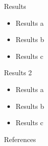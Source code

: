 \documentclass[final,hyperref={pdfpagelabels=false},xcolor=table]{beamer}
\begin{document}
\begin{frame}[t]
\begin{columns}[t]
\begin{column}{.3\textwidth}
    \begin{block}{Results}
     \begin{itemize}
          \item Results a
          \item Results b
          \item Results c
     \end{itemize}

    \end{block}

    \begin{block}{Results 2}
     \begin{itemize}
          \item Results a
          \item Results b
          \item Results c
     \end{itemize}

    \end{block}


    \begin{block}{References}
      \linespread{0.928}\selectfont
      \footnotesize{
      }
    \end{block}

  \end{column} %

  \begin{column}{.02\textwidth}\end{column} %

\end{columns} %

\end{frame} %
\end{document}
